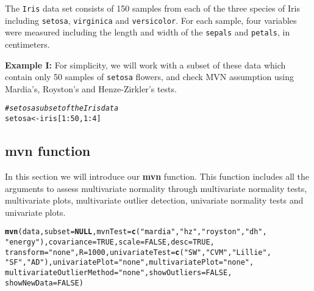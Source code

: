 \documentclass[11pt]{article}\usepackage[]{graphicx}\usepackage[]{color}
\makeatletter
\newcommand{\hlnum}[1]{\textcolor[rgb]{0.686,0.059,0.569}{#1}}%
\newcommand{\hlstr}[1]{\textcolor[rgb]{0.192,0.494,0.8}{#1}}%
\newcommand{\hlcom}[1]{\textcolor[rgb]{0.678,0.584,0.686}{\textit{#1}}}%
\newcommand{\hlopt}[1]{\textcolor[rgb]{0,0,0}{#1}}%
\newcommand{\hlstd}[1]{\textcolor[rgb]{0.345,0.345,0.345}{#1}}%
\newcommand{\hlkwa}[1]{\textcolor[rgb]{0.161,0.373,0.58}{\textbf{#1}}}%
\newcommand{\hlkwb}[1]{\textcolor[rgb]{0.69,0.353,0.396}{#1}}%
\newcommand{\hlkwc}[1]{\textcolor[rgb]{0.333,0.667,0.333}{#1}}%
\newcommand{\hlkwd}[1]{\textcolor[rgb]{0.737,0.353,0.396}{\textbf{#1}}}%
\newenvironment{kframe}{%
 \def\at@end@of@kframe{}%
 \ifinner\ifhmode%
  \def\at@end@of@kframe{\end{minipage}}%
  \begin{minipage}{\columnwidth}%
 \fi\fi%
 \def\FrameCommand##1{\hskip\@totalleftmargin \hskip-\fboxsep
 \colorbox{shadecolor}{##1}\hskip-\fboxsep
     \hskip-\linewidth \hskip-\@totalleftmargin \hskip\columnwidth}%
 \MakeFramed {\advance\hsize-\width
   \@totalleftmargin\z@ \linewidth\hsize
   \@setminipage}}%
 {\par\unskip\endMakeFramed%
 \at@end@of@kframe}
\newenvironment{knitrout}{}{} %
\makeatother
\begin{document}
The \texttt{Iris} data set consists of 150 samples from each of the three species of Iris including \texttt{setosa}, \texttt{virginica} and \texttt{versicolor}. For each sample, four variables were measured including the length and width of the \texttt{sepals} and \texttt{petals}, in centimeters. \\
\newline

\textbf{Example I:} For simplicity, we will work with a subset of these data which contain only 50 samples of \texttt{setosa} flowers, and check MVN assumption using Mardia's, Royston's and Henze-Zirkler's tests. 


\begin{knitrout}
\color{fgcolor}\begin{kframe}
\begin{alltt}
\hlcom{# setosa subset of the Iris data}
\hlstd{setosa} \hlkwb{<-} \hlstd{iris[}\hlnum{1}\hlopt{:}\hlnum{50}\hlstd{,} \hlnum{1}\hlopt{:}\hlnum{4}\hlstd{]}
\end{alltt}
\end{kframe}
\end{knitrout}

\subsection{mvn function} \label{subsec:mvntexttt}
In this section we will introduce our \textbf{mvn} function. This function includes all the arguments to assess multivariate normality through  multivariate normality tests, multivariate plots, multivariate outlier detection, univariate normality tests and univariate plots.


\begin{knitrout}
\color{fgcolor}\begin{kframe}
\begin{alltt}
\hlkwd{mvn}\hlstd{(data,} \hlkwc{subset} \hlstd{=} \hlkwa{NULL}\hlstd{,} \hlkwc{mvnTest} \hlstd{=} \hlkwd{c}\hlstd{(}\hlstr{"mardia"}\hlstd{,} \hlstr{"hz"}\hlstd{,} \hlstr{"royston"}\hlstd{,} \hlstr{"dh"}\hlstd{,}
  \hlstr{"energy"}\hlstd{),} \hlkwc{covariance} \hlstd{=} \hlnum{TRUE}\hlstd{,} \hlkwc{scale} \hlstd{=} \hlnum{FALSE}\hlstd{,} \hlkwc{desc} \hlstd{=} \hlnum{TRUE}\hlstd{,}
  \hlkwc{transform} \hlstd{=} \hlstr{"none"}\hlstd{,} \hlkwc{R} \hlstd{=} \hlnum{1000}\hlstd{,} \hlkwc{univariateTest} \hlstd{=} \hlkwd{c}\hlstd{(}\hlstr{"SW"}\hlstd{,} \hlstr{"CVM"}\hlstd{,} \hlstr{"Lillie"}\hlstd{,}
  \hlstr{"SF"}\hlstd{,} \hlstr{"AD"}\hlstd{),} \hlkwc{univariatePlot} \hlstd{=} \hlstr{"none"}\hlstd{,} \hlkwc{multivariatePlot} \hlstd{=} \hlstr{"none"}\hlstd{,}
  \hlkwc{multivariateOutlierMethod} \hlstd{=} \hlstr{"none"}\hlstd{,} \hlkwc{showOutliers} \hlstd{=} \hlnum{FALSE}\hlstd{,}
  \hlkwc{showNewData} \hlstd{=} \hlnum{FALSE}\hlstd{)}
\end{alltt}
\end{kframe}
\end{knitrout}
\end{document}
